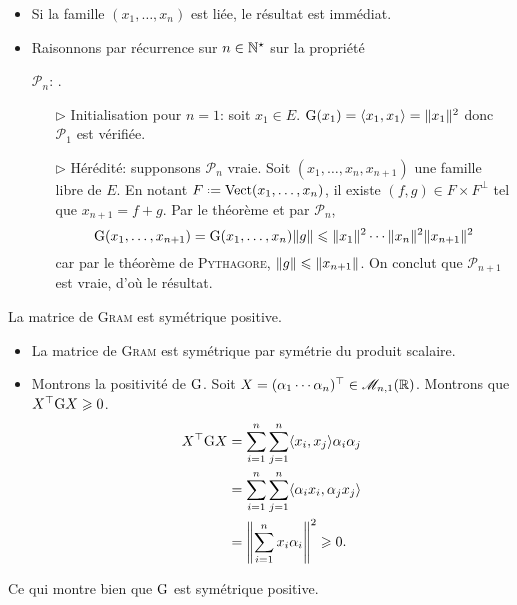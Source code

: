 \begin{preuve}
    \begin{itemize}
        \item Si la famille $(x_1, \dots, x_n)$ est liée, le résultat est immédiat.
        \item Raisonnons par récurrence sur $n \in \mathbb{N}^\star$ sur la propriété
        \begin{center}
            $\mathscr{P}_n$: .
        \end{center}
        \begin{itemize}
            \item[$\rhd$] Initialisation pour $n = 1$: soit $x_1 \in E$. $\mathrm{G}(x_1) = \langle x_1, x_1 \rangle = \Vert x_1 \Vert^2$ donc $\mathscr{P}_1$ est vérifiée.
            \item[$\rhd$] Hérédité: supponsons $\mathscr{P}_n$ vraie. Soit $(x_1, \dots, x_n, x_{n+1})$ une famille libre de $E$. En notant $F \defeq \Vect(x_1, \dots, x_n)$, il existe $(f, g) \in F \times F^\perp$ tel que $x_{n+1} = f + g$. Par le théorème  et par $\mathscr{P}_n$, 
            $$\mathrm{G}(x_1, \dots, x_{n+1}) = \mathrm{G}(x_1, \dots, x_n) \Vert g \Vert \leqslant \Vert x_1 \Vert^2 \cdots \Vert x_n \Vert^2 \Vert x_{n+1} \Vert^2$$
            car par le théorème de \textsc{Pythagore}, $\Vert g \Vert \leqslant \Vert x_{n+1} \Vert$. On conclut que $\mathscr{P}_{n+1}$ est vraie, d'où le résultat. 
        \end{itemize}
    \end{itemize}
\end{preuve}

\begin{prop}
    La matrice de \textsc{Gram} est symétrique positive.
\end{prop}

\begin{preuve}
    \begin{itemize}
        \item La matrice de \textsc{Gram} est symétrique par symétrie du produit scalaire.
        \item Montrons la positivité de $\mathrm{G}$. Soit $X = (\alpha_1 \cdots \alpha_n)^\top \in \mathscr{M}_{n,1}(\mathbb{R})$. Montrons que $X^\top \mathrm{G} X \geqslant 0$. 
        \begin{align*}
            X^\top \mathrm{G} X &= \sum_{i=1}^{n} \sum_{j=1}^{n} \langle x_i, x_j \rangle \alpha_i \alpha_j \\ 
            &= \sum_{i=1}^{n} \sum_{j=1}^{n} \langle \alpha_i x_i, \alpha_j x_j \rangle \\
            &= \left\Vert \sum_{i=1}^{n}x_i \alpha_i \right\Vert^2 \geqslant 0.
        \end{align*}
    \end{itemize}
   
    Ce qui montre bien que $\mathrm{G}$ est symétrique positive.
\end{preuve}

